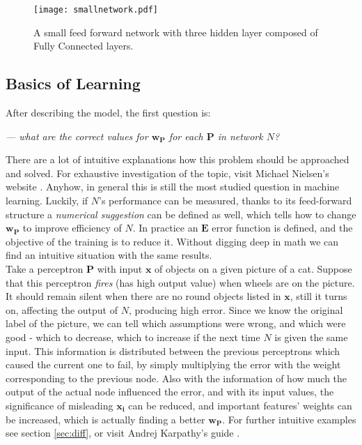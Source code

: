 \begin{figure}
	\centering
	\texttt{[image: smallnetwork.pdf]}
	\caption{A small feed forward network with three hidden layer composed of Fully Connected layers.
	}
	\label{fig:ff}
\end{figure}

\subsection{Basics of Learning}
After describing the model, the first question is:
\begin{flushright}
    \emph{--- what are the correct values for $\mathbf{w_P}$ for each $   
    \mathbf{P}$ in network $N$?} \\ 
\end{flushright}
There are a lot of intuitive explanations how this problem should be approached and solved. 
For exhaustive investigation of the topic, visit Michael Nielsen's website \cite{nnsdl}. 
Anyhow, in general this is still the most studied question in machine learning. 
Luckily, if $N$'s performance can be measured, thanks to its feed-forward structure a \emph{numerical suggestion} can be defined as well, which tells how to change $\mathbf{w_P}$ to improve efficiency of $N$. In practice an $\mathbf{E}$ error function is defined, and the objective of the training is to reduce it. Without digging deep in math we can find an intuitive situation with the same results.\\

Take a perceptron $\mathbf{P}$ with input $\mathbf{x}$ of objects on a given picture of a cat. Suppose that this perceptron \emph{fires} (has high output value) when wheels are on the picture. It should remain silent when there are no round objects listed in 
$\mathbf{x}$, still it turns on, affecting the output of $N$, producing high error.
Since we know the original label of the picture, we can tell which assumptions were wrong, and which were good - which to decrease, which to increase if the next time $N$ is given the same input. 
This information is distributed between the previous perceptrons which caused the current one to fail, by simply multiplying the error with the weight corresponding to the previous node. 
Also with the information of how much the output of the actual node influenced the error, and with its input values, the significance of misleading $\mathbf{x_i}$ can be reduced, and important features' weights can be increased, which is actually finding a better $\mathbf{w_P}$.
For further intuitive examples see section \ref{sec:diff}, or visit Andrej Karpathy's guide \cite{karpathyblog}.

